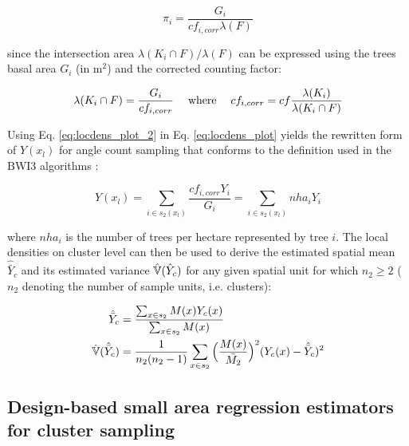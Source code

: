 \begin{equation}\label{eq:locdens_plot_2}
\pi_{i} = \frac{G_i}{cf_{i,corr}\lambda(F)}
	\end{equation}

since the intersection area $\lambda(K_i \cap F)/\lambda(F)$ can be expressed using the trees basal area $G_i$ (in m$^2$) and the corrected counting factor:

\begin{equation}\label{eq:locdens_plot_3}
\lambda(K_i \cap F) = \frac{G_i}{cf_{i, corr}} \hspace{3ex} \text{where} \hspace{3ex} cf_{i,corr} = cf\frac{\lambda(K_i)}{\lambda(K_i \cap F)}
\end{equation}

Using Eq. \ref{eq:locdens_plot_2} in Eq. \ref{eq:locdens_plot} yields the rewritten form of $Y(x_l)$ for angle count sampling that conforms to the definition used in the BWI3 algorithms \citep{bwi3_ausw}:

\begin{equation}\label{eq:locdens_plot_4}
Y(x_l)= \sum_{i \in s_{2}(x_l)} \frac{cf_{i, corr}Y_i}{G_i} = \sum_{i \in s_{2}(x_l)} nha_{i}{Y_i}
\end{equation}

where $nha_i$ is the number of trees per hectare represented by tree $i$. The local densities on cluster level can then be used to derive the estimated spatial mean $\hat{\bar{Y}}_c$ and its estimated variance $\hat{\mathbb{V}}(\hat{Y}_c)$ for any given spatial unit for which $n_2 \geq 2$ ($n_2$ denoting the number of sample units, i.e. clusters):

\begin{subequations}\label{eq:srs_est_clusters}
	\begin{align}
\hat{\bar{Y}}_c &= \frac{\sum_{x \in s_2} M(x) Y_{c}(x)}{\sum_{x \in s_2} M(x)} \\
\hat{\mathbb{V}}(\hat{\bar{Y}}_c) &= \frac{1}{n_2(n_2 - 1)}\sum_{x \in s_2}\Big(\frac{M(x)}{\bar{M_2}}\Big)^2(Y_{c}(x) - \hat{\bar{Y}}_c)^2
	\end{align}
\end{subequations}


\subsection{Design-based small area regression estimators for cluster sampling}
\label{sec:SAestimators}


